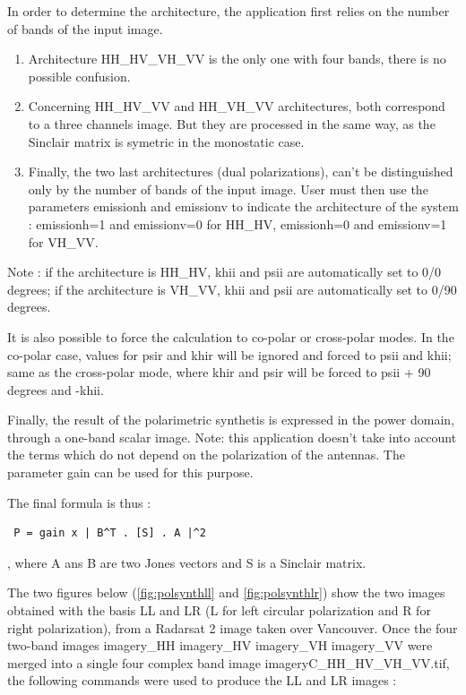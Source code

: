 In order to determine the architecture, the application first relies on the number of bands of the input image.
\begin{enumerate}
\item Architecture HH\_HV\_VH\_VV is the only one with four bands, there is no possible confusion.
\item Concerning HH\_HV\_VV and HH\_VH\_VV architectures, both correspond to a three channels image. But they are processed in the same way, as the Sinclair matrix is symetric in the monostatic case.
\item Finally, the two last architectures (dual polarizations), can't be distinguished only by the number of bands of the input image. User must then use the parameters emissionh and emissionv to indicate the architecture of the system : emissionh=1 and emissionv=0 for HH\_HV,  emissionh=0 and emissionv=1 for VH\_VV.
\end{enumerate}
Note : if the architecture is HH\_HV, khii and psii are automatically set to 0/0 degrees; if the architecture is VH\_VV, khii and psii are automatically set to 0/90 degrees.

It is also possible to force the calculation to co-polar or cross-polar modes.
In the co-polar case, values for psir and khir will be ignored and forced to psii and khii; same as the cross-polar mode, where khir and psir will be forced to psii + 90 degrees and -khii.

Finally, the result of the polarimetric synthetis is expressed in the power domain, through a one-band scalar image. \newline
Note: this application doesn't take into account the terms which do not depend on the polarization of the antennas. 
The parameter gain can be used for this purpose.

 
The final formula is thus : \begin{verbatim} P = gain x | B^T . [S] . A |^2 \end{verbatim} , where A ans B are two Jones vectors and S is a Sinclair matrix.
 
The two figures below (\ref{fig:polsynthll} and \ref{fig:polsynthlr}) show the two images obtained with the basis LL and LR (L for left circular polarization and R for right polarization),
from a Radarsat 2 image taken over Vancouver. Once the four two-band images imagery\_HH imagery\_HV imagery\_VH imagery\_VV were merged 
into a single four complex band image imageryC\_HH\_HV\_VH\_VV.tif, the following commands were used to produce the LL and LR images :


